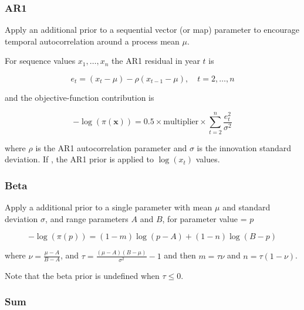 \subsubsection{AR1}\label{sec:AdditionalPrior-AR1}

Apply an  additional prior to a sequential vector (or map) parameter to encourage temporal autocorrelation around a process mean $\mu$.

For sequence values $x_1,\dots,x_n$ the AR1 residual in year $t$ is

\begin{equation}
e_t = (x_t - \mu) - \rho(x_{t-1} - \mu), \quad t = 2,\dots,n
\end{equation}

and the objective-function contribution is

\begin{equation}
- \log \left(\pi \left(\mathbf{x} \right) \right) = 0.5\times \text{multiplier} \times \sum_{t=2}^{n}\frac{e_t^2}{\sigma^2}
\end{equation}

where $\rho$ is the AR1 autocorrelation parameter and $\sigma$ is the innovation standard deviation. If , the AR1 prior is applied to $\log(x_t)$ values.

\subsubsection{Beta}\label{sec:AdditionalPrior-Beta}

Apply a  additional prior to a single parameter with mean $\mu$ and standard deviation $\sigma$, and range parameters $A$ and $B$, for parameter value = $p$

\begin{equation}
- \log \left(\pi \left( p \right) \right) = \left( 1 - m \right) \log \left( p - A \right) + \left( 1 - n \right)\log \left( B - p \right)
\end{equation}

where $\nu  = \frac{\mu  - A}{B - A}$, and $\tau = \frac{\left(\mu -A \right)\left(B - \mu \right)}{\sigma ^2} - 1$ and then $m=\tau \nu$ and $n=\tau(1-\nu)$. 

Note that the beta prior is undefined when $\tau \leq 0$.

\subsubsection{Sum}\label{sec:AdditionalPrior-Sum}
	
